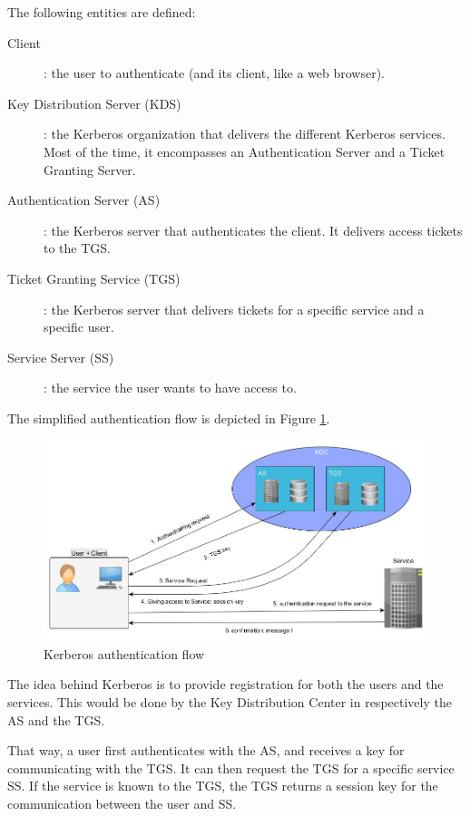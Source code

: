 The following entities are defined:
\begin{description}
	\item[Client]: the user to authenticate (and its client, like a web browser).
	\item[Key Distribution Server (KDS)]: the Kerberos organization that delivers the different Kerberos services. Most of the time, it encompasses an Authentication Server and a Ticket Granting Server.
	\item[Authentication Server (AS)]: the Kerberos server that authenticates the client. It delivers access tickets to the TGS.
	\item[Ticket Granting Service (TGS)]: the Kerberos server that delivers tickets for a specific service and a specific user.
	\item[Service Server (SS)]: the service the user wants to have access to. 
\end{description}

The simplified authentication flow is depicted in Figure \ref{fig:kerberos_simple}.

\begin{figure}[!ht]
	\centering
	\caption{Kerberos authentication flow}
	\label{fig:kerberos_simple}
	\includegraphics[scale=0.4]{images/kerberos_simple}
\end{figure}

The idea behind Kerberos is to provide registration for both the users and the services. This would be done by the Key Distribution Center in respectively the AS and the TGS.

That way, a user first authenticates with the AS, and receives a key for communicating with the TGS. It can then request the TGS for a specific service SS. If the service is known to the TGS, the TGS returns a session key for the communication between the user and SS. 

